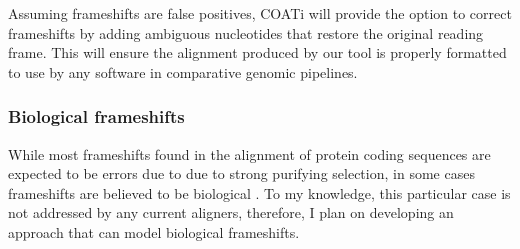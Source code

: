 

Assuming frameshifts are false positives, COATi will provide the option to
correct frameshifts by adding ambiguous nucleotides that restore the original
reading frame.
This will ensure the alignment produced by our tool is properly formatted to use
by any software in comparative genomic pipelines.

\subsubsection{Biological frameshifts}

While most frameshifts found in the alignment of protein coding sequences are
expected to be errors due to due to strong purifying selection, in some cases
frameshifts are believed to be biological \parencite{hu2012predicting}.
To my knowledge, this particular case is not addressed by any current aligners,
therefore, I plan on developing an approach that can model biological
frameshifts.

